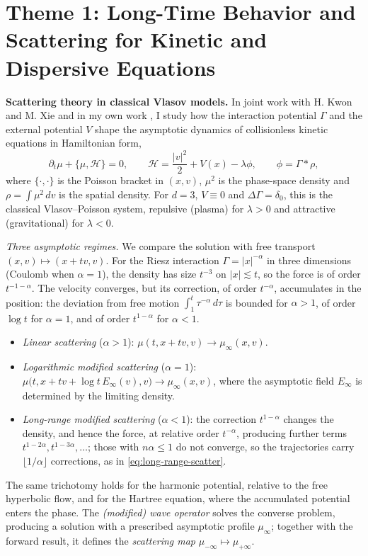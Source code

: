 \documentclass[10pt,reqno]{amsart}
\theoremstyle{definition}
\def\pr{\partial}
\def\H{\mathcal{H}}
\begin{document}
\section*{Theme 1: Long-Time Behavior and Scattering for Kinetic and Dispersive Equations}
 
\noindent\textbf{Scattering theory in classical Vlasov models.} In joint work with H. Kwon and M. Xie and in my own work \cite{H26,HK24,HK26,HX26b}, I study how the interaction potential $\Gamma$ and the external potential $V$ shape the asymptotic dynamics of collisionless kinetic equations in Hamiltonian form,
\begin{equation}\label{eq:VP}
\pr_t\mu+\{\mu,\H\}=0,\qquad \H=\frac{|v|^2}{2}+V(x)-\lambda\phi,\qquad \phi=\Gamma*\rho,
\end{equation}
where $\{\cdot,\cdot\}$ is the Poisson bracket in $(x,v)$, $\mu^2$ is the phase-space density and $\rho=\int\mu^2\,dv$ is the spatial density. For $d=3$, $V\equiv0$ and $\Delta\Gamma=\delta_0$, this is the classical Vlasov--Poisson system, repulsive (plasma) for $\lambda>0$ and attractive (gravitational) for $\lambda<0$.
 
\smallskip
 
\noindent\emph{Three asymptotic regimes.} We compare the solution with free transport $(x,v)\mapsto(x+tv,v)$. For the Riesz interaction $\Gamma=|x|^{-\alpha}$ in three dimensions (Coulomb when $\alpha=1$), the density has size $t^{-3}$ on $|x|\lesssim t$, so the force is of order $t^{-1-\alpha}$. The velocity converges, but its correction, of order $t^{-\alpha}$, accumulates in the position: the deviation from free motion $\int_1^t\tau^{-\alpha}\,d\tau$ is bounded for $\alpha>1$, of order $\log t$ for $\alpha=1$, and of order $t^{1-\alpha}$ for $\alpha<1$.
\begin{itemize}
\item \emph{Linear scattering} ($\alpha>1$): $\mu(t,x+tv,v)\to\mu_\infty(x,v)$.
\item \emph{Logarithmic modified scattering} ($\alpha=1$): $\mu\bigl(t,x+tv+\log t\,E_\infty(v),v\bigr)\to\mu_\infty(x,v)$, where the asymptotic field $E_\infty$ is determined by the limiting density.
\item \emph{Long-range modified scattering} ($\alpha<1$): the correction $t^{1-\alpha}$ changes the density, and hence the force, at relative order $t^{-\alpha}$, producing further terms $t^{1-2\alpha},t^{1-3\alpha},\dots$; those with $n\alpha\leq1$ do not converge, so the trajectories carry $\lfloor1/\alpha\rfloor$ corrections, as in \eqref{eq:long-range-scatter}.
\end{itemize}
The same trichotomy holds for the harmonic potential, relative to the free hyperbolic flow, and for the Hartree equation, where the accumulated potential enters the phase. The \emph{(modified) wave operator} solves the converse problem, producing a solution with a prescribed asymptotic profile $\mu_\infty$; together with the forward result, it defines the \emph{scattering map} $\mu_{-\infty}\mapsto\mu_{+\infty}$.
 
\end{document}
